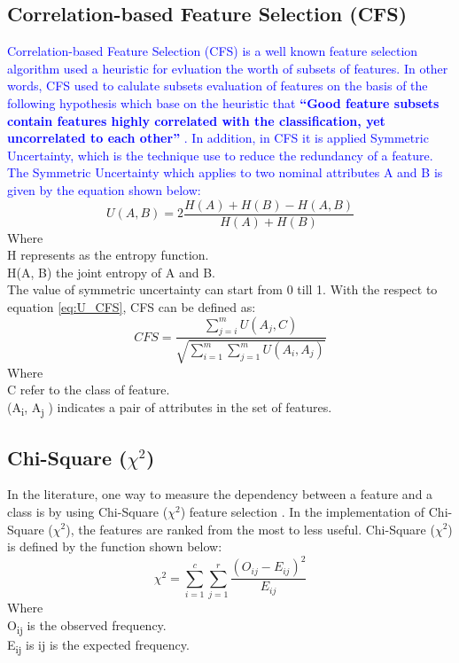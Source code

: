 \documentclass[review]{elsarticle}
\begin{document}
\subsection{Correlation-based Feature Selection (CFS)}
\label{subsec:CFS}
\textcolor{blue}{
Correlation-based Feature Selection (CFS) is a well known feature selection algorithm used a heuristic for evluation  the worth of subsets of features. In other words, CFS used to calulate subsets evaluation of features on the basis of the following hypothesis which base on the heuristic that \textbf{\enquote{Good feature subsets contain features highly correlated with the classification, yet uncorrelated to each other}}  \cite{Hall1999} \cite{Lewandowski2015}. In addition, in CFS it is applied Symmetric Uncertainty, which is the technique use to reduce the redundancy of a feature. The Symmetric Uncertainty which applies to two nominal attributes A and B is given by the equation shown below:}
\begin{equation}
U(A,B) =2 \dfrac{H(A)+H(B)-H(A,B)}{H(A) + H(B)}
\label{eq:U_CFS}
\end{equation}
Where \\
H represents as the entropy function.\\
H(A, B) the joint entropy of A and B. \\
The value of symmetric uncertainty can start from 0 till 1. 
With the respect to equation \ref{eq:U_CFS}, CFS can be defined as: 
\begin{equation}
	CFS= \dfrac{\sum_{j=i}^m U(A_j,C)}{\sqrt{\sum_{i=1}^m \sum_{j=1}^m U(A_i,A_j)}}
	\label{eq:CFS}
\end{equation}
Where \\
C refer to the class of feature. \\
(A\textsubscript{i}, A\textsubscript{j} ) indicates a pair of attributes in the set of features.


\subsection{Chi-Square ($\chi^2$)}
\label{subsec:chi_sq}
In the literature, one way to measure the dependency between a feature and a class is by using Chi-Square ($\chi^2$) feature selection \cite{Plackett1983}. In the implementation of Chi-Square ($\chi^2$), the features are ranked from the most to less useful. Chi-Square ($\chi^2$) is defined by the function shown below:
\begin{equation}
\chi^2 = \sum_{i=1}^{c} \sum_{j=1}^{r} \dfrac{(O_{ij} - E_{ij})^2}{E_{ij}}
\label{eq:chi-sq}
\end{equation}
Where\\
O\textsubscript{ij} is the observed frequency.\\ 
E\textsubscript{ij} is ij is the expected frequency. 
\end{document}
